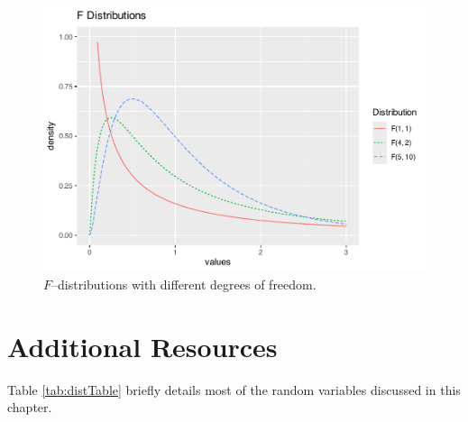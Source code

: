 \documentclass[
]{krantz}
\begin{document}
\begin{figure}

{\centering \includegraphics[width=0.6\linewidth]{bookdown-BeyondMLR_files/figure-latex/multF-1} 

}

\caption{\(F\)--distributions with different degrees of freedom.}\label{fig:multF}
\end{figure}

\hypertarget{additional-resources}{%
\section{Additional Resources}\label{additional-resources}}

Table \ref{tab:distTable} briefly details most of the random variables discussed in this chapter.
\end{document}
